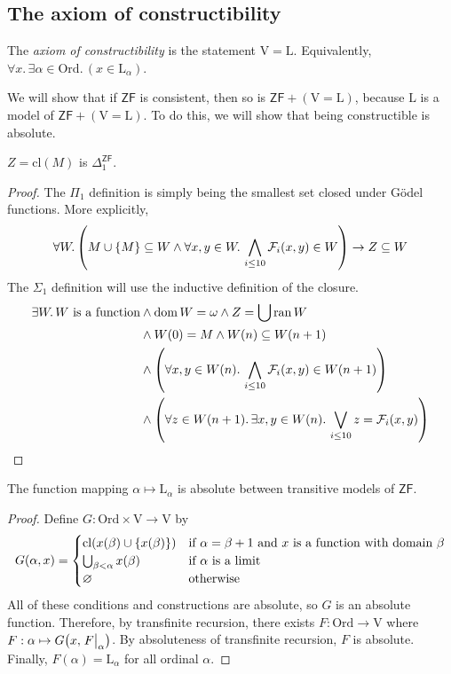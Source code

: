\subsection{The axiom of constructibility}
\begin{definition}
    The \emph{axiom of constructibility} is the statement \( \mathrm{V} = \mathrm{L} \).
    Equivalently, \( \forall x.\, \exists \alpha \in \mathrm{Ord}.\, (x \in \mathrm{L}_\alpha) \).
\end{definition}
We will show that if \( \mathsf{ZF} \) is consistent, then so is \( \mathsf{ZF} + (\mathrm{V} = \mathrm{L}) \), because \( \mathrm{L} \) is a model of \( \mathsf{ZF} + (\mathrm{V} = \mathrm{L}) \).
To do this, we will show that being constructible is absolute.
\begin{lemma}
    \( Z = \mathrm{cl}(M) \) is \( \Delta_1^{\mathsf{ZF}} \).
\end{lemma}
\begin{proof}
    The \( \Pi_1 \) definition is simply being the smallest set closed under G\"odel functions.
    More explicitly,
    \[ \forall W.\, \qty(M \cup \qty{M} \subseteq W \wedge \forall x, y \in W.\, \bigwedge_{i \leq 10} \mathcal F_i(x, y) \in W) \to Z \subseteq W \]
    The \( \Sigma_1 \) definition will use the inductive definition of the closure.
    \begin{align*}
        \exists W.\, W \text{ is a function} &\wedge \operatorname{dom} W = \omega \wedge Z = \bigcup \operatorname{ran} W \\
        &\wedge W(0) = M \wedge W(n) \subseteq W(n+1) \\
        &\wedge \qty(\forall x, y \in W(n).\, \bigwedge_{i \leq 10} \mathcal F_i(x, y) \in W(n+1)) \\
        &\wedge \qty(\forall z \in W(n+1).\, \exists x, y \in W(n).\, \bigvee_{i \leq 10} z = \mathcal F_i(x, y))
    \end{align*}
\end{proof}
\begin{lemma}
    The function mapping \( \alpha \mapsto \mathrm{L}_\alpha \) is absolute between transitive models of \( \mathsf{ZF} \).
\end{lemma}
\begin{proof}
    Define \( G : \mathrm{Ord} \times \mathrm{V} \to \mathrm{V} \) by
    \[ G(\alpha, x) = \begin{cases}
        \mathrm{cl}(x(\beta) \cup \qty{x(\beta)}) & \text{if } \alpha = \beta + 1 \text{ and } x \text{ is a function with domain } \beta \\
        \bigcup_{\beta < \alpha} x(\beta) & \text{if } \alpha \text{ is a limit} \\
        \varnothing & \text{otherwise}
    \end{cases} \]
    All of these conditions and constructions are absolute, so \( G \) is an absolute function.
    Therefore, by transfinite recursion, there exists \( F : \mathrm{Ord} \to \mathrm{V} \) where \( F : \alpha \mapsto G\qty(x, \eval{F}_\alpha) \).
    By absoluteness of transfinite recursion, \( F \) is absolute.
    Finally, \( F(\alpha) = \mathrm{L}_\alpha \) for all ordinal \( \alpha \).
\end{proof}
